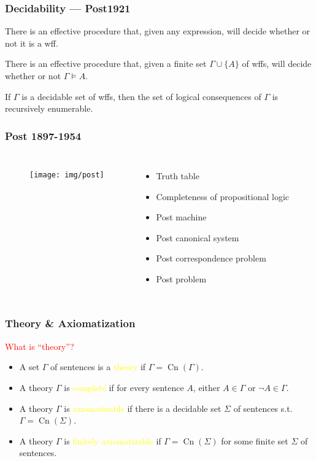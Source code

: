 \documentclass[UTF8,aspectratio=43,11pt,colorlinks,compress,openany]{beamer}%
\begin{document}
\begin{frame}\frametitle{Decidability --- Post1921}
	\begin{theorem}
		There is an effective procedure that, given any expression, will decide whether or not it is a wff.
	\end{theorem}
	\begin{theorem}
		There is an effective procedure that, given a finite set $\Gamma\cup\{A\}$ of wffs, will decide whether or not $\Gamma\vDash A$.
	\end{theorem}
	\begin{theorem}
		If $\Gamma$ is a decidable set of wffs, then the set of logical consequences of $\Gamma$ is recursively enumerable.
	\end{theorem}
\end{frame}

\begin{frame}\frametitle{Post 1897-1954}
\begin{columns}
\begin{figure}
	\texttt{[image: img/post]}
\end{figure}
\begin{itemize}
	\item Truth table
	\item Completeness of propositional logic
	\item Post machine
	\item Post canonical system
	\item Post correspondence problem
	\item Post problem
\end{itemize}
\end{columns}
\end{frame}

\begin{frame}\frametitle{Theory \& Axiomatization}
	\begin{block}{}
		\centering\textcolor{red}{What is ``theory''?}
	\end{block}
	\begin{itemize}
		\item A set $\Gamma$ of sentences is a \textcolor{yellow}{theory} if $\Gamma=\operatorname{Cn}(\Gamma)$.
		\item A theory $\Gamma$ is \textcolor{yellow}{complete} if for every sentence $A$, either $A\in\Gamma$ or $\neg A\in\Gamma$.
		\item A theory $\Gamma$ is \textcolor{yellow}{axiomatizable} if there is a decidable set $\Sigma$ of sentences s.t. $\Gamma=\operatorname{Cn}(\Sigma)$.
		\item A theory $\Gamma$ is \textcolor{yellow}{finitely axiomatizable} if $\Gamma=\operatorname{Cn}(\Sigma)$ for some finite set $\Sigma$ of sentences.
	\end{itemize}
\end{frame}
\end{document}
